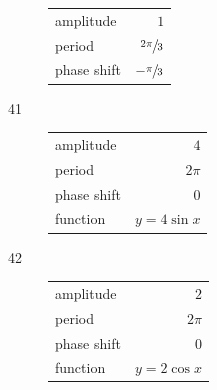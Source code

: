 \documentclass{exam}
\begin{document}
\begin{description}
        \begin{tabular}[H]{lr}
          \toprule
          amplitude   & $1$ \\
          period      & $\sfrac{2 \pi}{3}$ \\
          phase shift & $- \sfrac{\pi}{3}$ \\
          \bottomrule
        \end{tabular}

      \pagebreak




    \item[41]
      \begin{tabular}[H]{lr}
        \toprule
        amplitude   & $4$ \\
        period      & $2 \pi$ \\
        phase shift & $0$ \\
        function    & $y = 4 \sin x$ \\
        \bottomrule
      \end{tabular}

    \item[42]
      \begin{tabular}[H]{lr}
        \toprule
        amplitude   & $2$ \\
        period      & $2 \pi$ \\
        phase shift & $0$ \\
        function    & $y = 2 \cos x$ \\
        \bottomrule
      \end{tabular}


\end{description}
\end{document}
